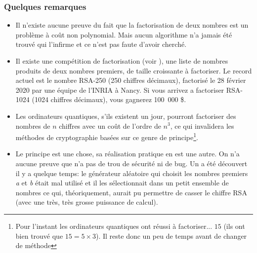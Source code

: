 \subsubsection{Quelques remarques}
\begin{itemize}
  \item Il n'existe aucune preuve du fait que la factorisation de deux
    nombres est un problème à coût non polynomial. Mais aucun
    algorithme n'a jamais été trouvé qui l'infirme et ce n'est pas
    faute d'avoir  cherché.
  \item Il existe une compétition de factorisation (voir \cite{rsafac}),
    une liste de nombres produits de deux nombres premiers, de taille
    croissante à factoriser. Le record actuel est le nombre RSA-250
    (250 chiffres décimaux), factorisé le 28 février 2020 par une
    équipe de l'INRIA à Nancy. Si vous arrivez a factoriser RSA-1024
    (1024 chiffres décimaux),
    vous gagnerez 100~000 \$.
  \item Les ordinateurs quantiques, s'ils existent un jour, pourront
    factoriser des nombres de $n$ chiffres avec un coût de
    l'ordre de $n^3$, ce qui invalidera les méthodes de
    cryptographie basées sur ce genre de principe\footnote{Pour
      l'instant les \og ordinateurs 
      quantiques\fg{} ont réussi à
      factoriser... $15$ (ils ont bien 
      trouvé que $15 = 5 \times 3$). Il reste donc un peu de temps
      avant de changer de méthode}.
  \item Le principe est une chose, sa réalisation pratique en est une
    autre. On n'a aucune preuve que  n'a pas de trou de
    sécurité ni de bug. Un a été découvert il y a quelque temps: le générateur
    aléatoire qui choisit les nombres premiers \emph{a} et \emph{b}
    était mal utilisé et il les sélectionnait dans un petit ensemble de
    nombres ce qui, théoriquement, aurait pu permettre de casser le
    chiffre RSA (avec une très, très grosse puissance de calcul).
\end{itemize}
    

